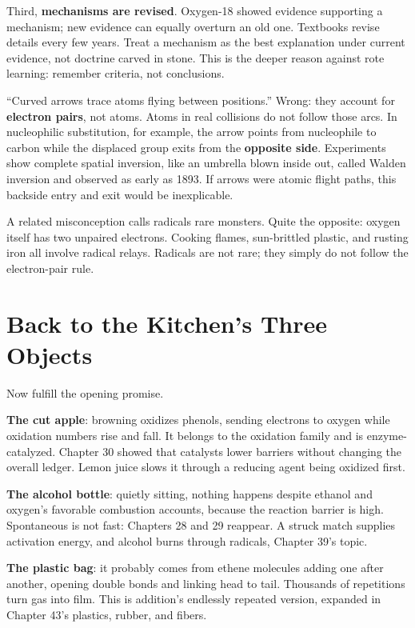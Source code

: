 Third, \textbf{mechanisms are revised}. Oxygen-18 showed evidence supporting a mechanism; new evidence can equally overturn an old one. Textbooks revise details every few years. Treat a mechanism as the best explanation under current evidence, not doctrine carved in stone. This is the deeper reason against rote learning: remember criteria, not conclusions.

\begin{wuqu}
``Curved arrows trace atoms flying between positions.'' Wrong: they account for \textbf{electron pairs}, not atoms. Atoms in real collisions do not follow those arcs. In nucleophilic substitution, for example, the arrow points from nucleophile to carbon while the displaced group exits from the \textbf{opposite side}. Experiments show complete spatial inversion, like an umbrella blown inside out, called Walden inversion and observed as early as 1893. If arrows were atomic flight paths, this backside entry and exit would be inexplicable.

A related misconception calls radicals rare monsters. Quite the opposite: oxygen itself has two unpaired electrons. Cooking flames, sun-brittled plastic, and rusting iron all involve radical relays. Radicals are not rare; they simply do not follow the electron-pair rule.
\end{wuqu}

\section{Back to the Kitchen's Three Objects}

Now fulfill the opening promise.

\textbf{The cut apple}: browning oxidizes phenols, sending electrons to oxygen while oxidation numbers rise and fall. It belongs to the oxidation family and is enzyme-catalyzed. Chapter 30 showed that catalysts lower barriers without changing the overall ledger. Lemon juice slows it through a reducing agent being oxidized first.

\textbf{The alcohol bottle}: quietly sitting, nothing happens despite ethanol and oxygen's favorable combustion accounts, because the reaction barrier is high. Spontaneous is not fast: Chapters 28 and 29 reappear. A struck match supplies activation energy, and alcohol burns through radicals, Chapter 39's topic.

\textbf{The plastic bag}: it probably comes from ethene molecules adding one after another, opening double bonds and linking head to tail. Thousands of repetitions turn gas into film. This is addition's endlessly repeated version, expanded in Chapter 43's plastics, rubber, and fibers.

